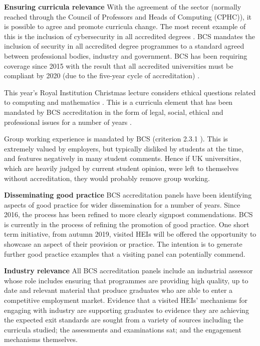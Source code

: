 \documentclass[sigconf]{acmart}
\begin{document}
{\textbf{Ensuring curricula relevance}}
With the agreement of the sector (normally reached through the Council of Professors and Heads of Computing (CPHC)), it is possible to agree and promote curricula change. The most recent example of this is the inclusion of cybersecurity in all accredited degrees \cite{Cricketal2019}. 
BCS mandates the inclusion of security in all accredited degree programmes to a standard agreed between professional bodies, industry and government. %
BCS has been requiring coverage since 2015 \cite[p.~17--18]{BCS2018a} with the result that all accredited universities must be compliant by 2020 (due to the five-year cycle of accreditation) \cite{Cricketal2019}. 

This year's Royal Institution Christmas lecture considers ethical questions related to computing and mathematics \cite{RoyalInstitution2019}. This is a curricula element that has been mandated by BCS accreditation in the form of legal, social, ethical and professional issues for a number of years \cite{Brooke2018}.

Group working experience is mandated by BCS (criterion 2.3.1 \cite [p31] {BCS2018a}). This is extremely valued by employers, but typically disliked by students at the time, and features negatively in many student comments. Hence if UK universities, which are heavily judged by current student opinion, were left to themselves without accreditation, they would probably remove group working.  %

{\textbf{Disseminating good practice}}
BCS accreditation panels have been identifying aspects of good practice for wider dissemination for a number of years. 
Since 2016, the process has been refined to more clearly signpost commendations. BCS is currently in the process of refining the promotion of good practice. One short term initiative, from autumn 2019, visited HEIs will be offered the opportunity to showcase an aspect of their provision or practice. The intention is to generate further good practice examples that a visiting panel can potentially commend.

{\textbf{Industry relevance}}
All BCS accreditation panels include an industrial assessor whose role includes ensuring that programmes are providing high quality, up to date and relevant material that produce graduates who are able to enter a competitive employment market. Evidence that a visited HEIs' mechanisms for engaging with industry are supporting graduates to evidence they are achieving the expected exit standards are sought from a variety of sources including the curricula studied; the assessments and examinations sat; and the engagement mechanisms themselves. 
\end{document}
